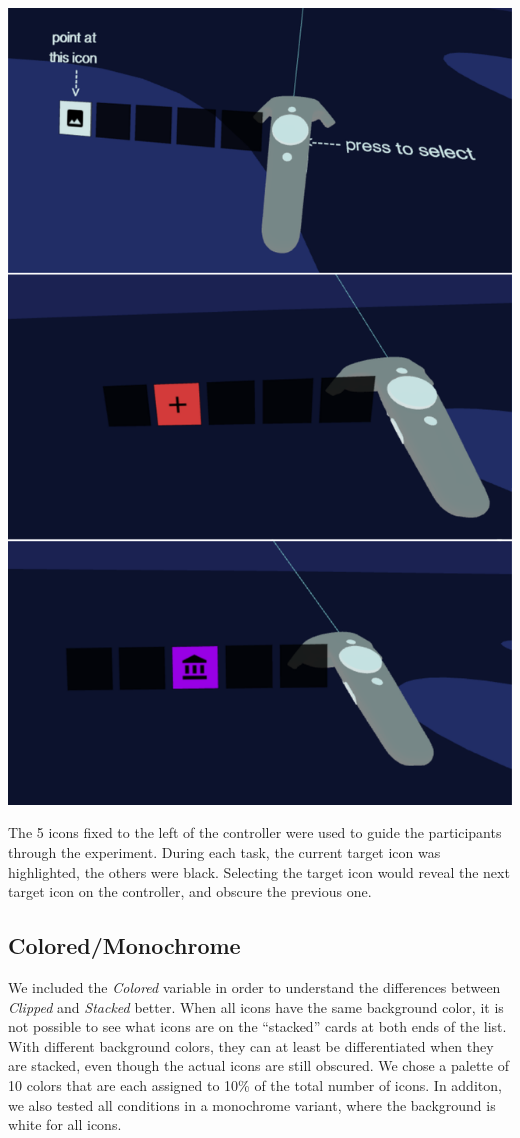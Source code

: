 \documentclass{tufte-book} %
\begin{document}
\begin{marginfigure}
  \includegraphics[width=\linewidth]{controllers.png}
  \caption{The 5 icons fixed to the left of the controller were used to guide the participants through the experiment. During each task, the current target icon was highlighted, the others were black. Selecting the target icon would reveal the next target icon on the controller, and obscure the previous one.}
  \label{fig:controllers}
\end{marginfigure}

\subsection{Colored/Monochrome}
We included the \emph{Colored} variable in order to understand the differences between \emph{Clipped} and \emph{Stacked} better. When all icons have the same background color, it is not possible to see what icons are on the ``stacked'' cards at both ends of the list. With different background colors, they can at least be differentiated when they are stacked, even though the actual icons are still obscured. We chose a palette of 10 colors that are each assigned to 10\% of the total number of icons. In additon, we also tested all conditions in a monochrome variant, where the background is white for all icons.
\end{document}
